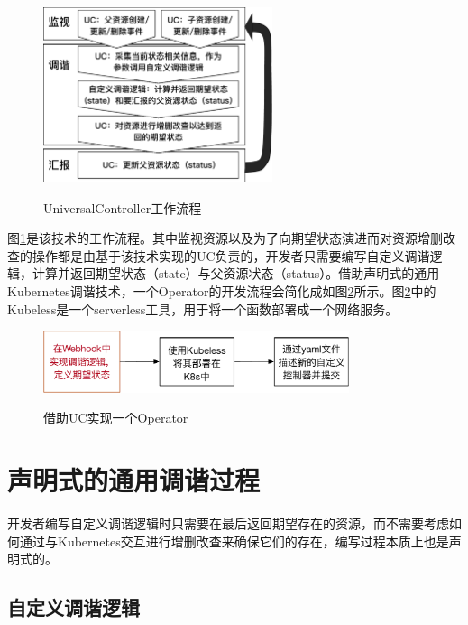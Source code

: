 \documentclass[macfonts,master]{njuthesis}
\begin{document}
\begin{figure}[htbp]
  \centering
  \includegraphics[width=0.6\textwidth]{pics/UniversalController-Workflow.pdf}\\
  \caption{UniversalController工作流程}\label{fig:UniversalController-Workflow}
\end{figure}

图\ref{fig:UniversalController-Workflow}是该技术的工作流程。其中监视资源以及为了向期望状态演进而对资源增删改查的操作都是由基于该技术实现的UC负责的，开发者只需要编写自定义调谐逻辑，计算并返回期望状态（state）与父资源状态（status）。借助声明式的通用Kubernetes调谐技术，一个Operator的开发流程会简化成如图\ref{fig:uc-coding-operator}所示。图\ref{fig:uc-coding-operator}中的Kubeless是一个serverless工具，用于将一个函数部署成一个网络服务。


\begin{figure}[htbp]
  \centering
  \includegraphics[width=0.8\textwidth]{pics/uc-coding-operator.pdf}\\
  \caption{借助UC实现一个Operator}\label{fig:uc-coding-operator}
\end{figure}

\section{声明式的通用调谐过程}\label{section:dur}
开发者编写自定义调谐逻辑时只需要在最后返回期望存在的资源，而不需要考虑如何通过与Kubernetes交互进行增删改查来确保它们的存在，编写过程本质上也是声明式的。

\subsection{自定义调谐逻辑}
\end{document}
